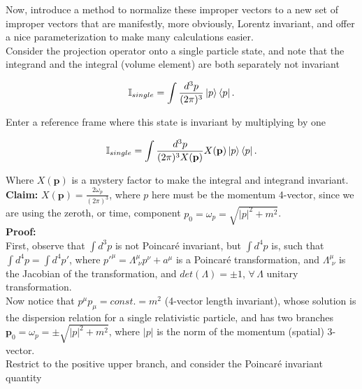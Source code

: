\noindent Now, introduce a method to normalize these improper vectors to a new set of improper vectors that are manifestly, more obviously, Lorentz invariant, and offer a nice parameterization to make many calculations easier. \\

\noindent Consider the projection operator onto a single particle state, and note that the integrand and the integral (volume element) are both separately not invariant

\begin{equation}
\mathbb{I}_{single} = \int \frac{d^3 p}{(2\pi)^3} \ket{p}\bra{p}.
\end{equation}

\noindent Enter a reference frame where this state is invariant by multiplying by one

\begin{equation}
\mathbb{I}_{single} = \int \frac{d^3 p}{(2\pi)^3 X(\textbf{p})} X(\textbf{p}) \ket{p}\bra{p}.
\end{equation}

\noindent Where $X(\textbf{p})$ is a mystery factor to make the integral and integrand invariant. \\

\noindent \textbf{Claim:} $X(\textbf{p}) = \frac{2 \omega_p}{(2\pi)^3}$, where $p$ here must be the momentum 4-vector, since we are using the zeroth, or time, component $p_0 = \omega_p = \sqrt{|p|^2 + m^2}$. \\

\noindent \textbf{Proof:} \\

\noindent First, observe that $\int d^3 p$ is not Poincar\'e invariant, but $\int d^4 p$ is, such that $\int d^4 p = \int d^4 p'$, where $p'^\mu = \Lambda^\mu_{\,\,\nu} p^\nu + a^\mu$ is a Poincar\'e transformation, and $\Lambda^\mu_{\,\,\nu}$ is the Jacobian of the transformation, and $det(\Lambda)= \pm 1$, $\forall \, \Lambda$ unitary transformation. \\

\noindent Now notice that $p^\mu p_\mu = const. = m^2$ (4-vector length invariant), whose solution is the dispersion relation for a single relativistic particle, and has two branches $\textbf{p}_0 = \omega_{p} = \pm \sqrt{|p|^2 + m^2}$, where $|p|$ is the norm of the momentum (spatial) 3-vector.  \\

\noindent Restrict to the positive upper branch, and consider the Poincar\'e invariant quantity

